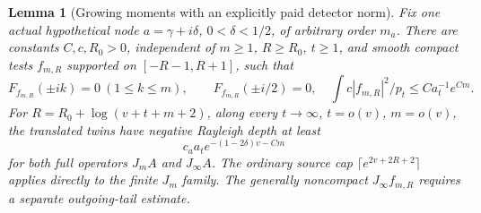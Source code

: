 \documentclass[11pt]{article}
\newtheorem{lemma}[theorem]{Lemma}
\theoremstyle{remark}\newtheorem{remark}[theorem]{Remark}
\begin{document}
\begin{lemma}[Growing moments with an explicitly paid detector norm]
\label{lem:growing-moment-detectors}
Fix one actual hypothetical node \(a=\gamma+i\delta\),
\(0<\delta<1/2\), of arbitrary order \(m_a\).
There are constants \(C,c,R_0>0\), independent of \(m\ge1\),
\(R\ge R_0\), \(t\ge1\), and smooth compact tests \(f_{m,R}\)
supported on \([-R-1,R+1]\), such that
\[
 F_{f_{m,R}}(\pm ik)=0\ (1\le k\le m),\qquad
 F_{f_{m,R}}(\pm i/2)=0,
 \quad \int c|f_{m,R}|^2/p_t\le C a_t^{-1}e^{Cm}.    \tag{GL9}
\]
For \(R=R_0+\log(v+t+m+2)\), along every
\(t\to\infty\), \(t=o(v)\), \(m=o(v)\), the translated
twins have negative Rayleigh depth at least
\[
 c_a a_t e^{-(1-2\delta)v-Cm}                         \tag{GL10}
\]
for both full operators \(J_mA\) and \(J_\infty A\).
The ordinary source cap \(\lceil e^{2v+2R+2}\rceil\) applies
directly to the finite \(J_m\) family. The generally noncompact
\(J_\infty f_{m,R}\) requires a separate outgoing-tail estimate.
\end{lemma}
\end{document}

